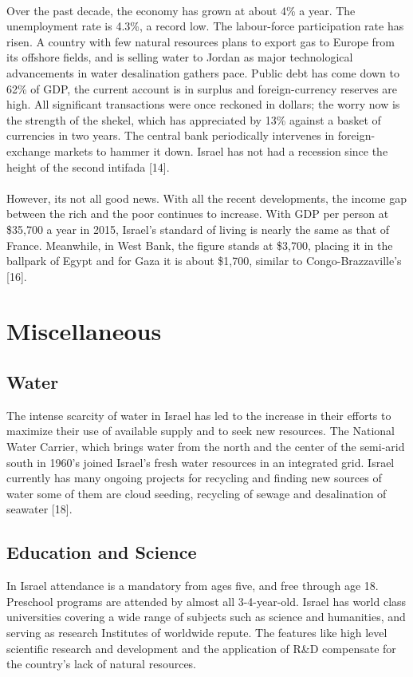 \documentclass[10pt]{article}
\begin{document}
\\
Over the past decade, the economy has grown at about 4\% a year. The unemployment rate is 4.3\%, a record low. The labour-force participation rate has risen. A country with few natural resources plans to export gas to Europe from its offshore fields, and is selling water to Jordan as major technological advancements in water desalination gathers pace. Public debt has come down to 62\% of GDP, the current account is in surplus and foreign-currency reserves are high. All significant transactions were once reckoned in dollars; the worry now is the strength of the shekel, which has appreciated by 13\% against a basket of currencies in two years. The central bank periodically intervenes in foreign-exchange markets to hammer it down. Israel has not had a recession since the height of the second intifada [14].
\\
\\
However, its not all good news. With all the recent developments, the income gap between the rich and the poor continues to increase. With GDP per person at \$35,700 a year in 2015, Israel’s standard of living is nearly the same as that of France. Meanwhile, in West Bank, the figure stands at \$3,700, placing it in the ballpark of Egypt and for Gaza it is about \$1,700, similar to Congo-Brazzaville’s [16].

\section{Miscellaneous}

\subsection{Water}
The intense scarcity of water in Israel has led to the increase in their efforts to maximize their use of available supply and to seek new resources. The National Water Carrier, which brings water from the north and the center of the semi-arid south in 1960’s joined Israel's fresh water resources in an integrated grid. Israel currently has many ongoing projects for recycling and finding new sources of water some of them are cloud seeding, recycling of sewage and desalination of seawater [18]. 

\subsection{Education and Science}
In Israel attendance is a mandatory from ages five, and free through age 18. Preschool programs are attended by almost all 3-4-year-old. Israel has world class universities covering a wide range of subjects such as science and humanities, and serving as research Institutes of worldwide repute. The features like high level scientific research and development and the application of R\&D compensate for the country's lack of natural resources.
\end{document}
